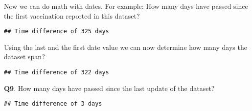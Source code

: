 \documentclass[
]{article}
\newenvironment{Shaded}{\begin{snugshade}}{\end{snugshade}}
\newcommand{\CommentTok}[1]{\textcolor[rgb]{0.56,0.35,0.01}{\textit{#1}}}
\newcommand{\DecValTok}[1]{\textcolor[rgb]{0.00,0.00,0.81}{#1}}
\newcommand{\FunctionTok}[1]{\textcolor[rgb]{0.00,0.00,0.00}{#1}}
\newcommand{\NormalTok}[1]{#1}
\newcommand{\OtherTok}[1]{\textcolor[rgb]{0.56,0.35,0.01}{#1}}
\newcommand{\SpecialCharTok}[1]{\textcolor[rgb]{0.00,0.00,0.00}{#1}}
\begin{document}
\begin{Shaded}
\end{Shaded}

Now we can do math with dates. For example: How many days have passed
since the first vaccination reported in this dataset?

\begin{Shaded}
\end{Shaded}

\begin{verbatim}
## Time difference of 325 days
\end{verbatim}

Using the last and the first date value we can now determine how many
days the dataset span?

\begin{Shaded}
\end{Shaded}

\begin{verbatim}
## Time difference of 322 days
\end{verbatim}

\textbf{Q9}. How many days have passed since the last update of the
dataset?

\begin{Shaded}
\end{Shaded}

\begin{verbatim}
## Time difference of 3 days
\end{verbatim}
\end{document}
